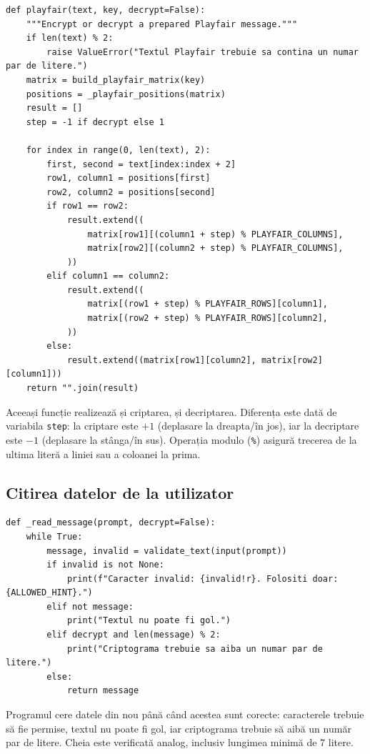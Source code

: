 \documentclass[12pt,a4paper]{article}
\begin{document}
\begin{lstlisting}[caption={Aplicarea celor trei reguli Playfair}]
def playfair(text, key, decrypt=False):
    """Encrypt or decrypt a prepared Playfair message."""
    if len(text) % 2:
        raise ValueError("Textul Playfair trebuie sa contina un numar par de litere.")
    matrix = build_playfair_matrix(key)
    positions = _playfair_positions(matrix)
    result = []
    step = -1 if decrypt else 1

    for index in range(0, len(text), 2):
        first, second = text[index:index + 2]
        row1, column1 = positions[first]
        row2, column2 = positions[second]
        if row1 == row2:
            result.extend((
                matrix[row1][(column1 + step) % PLAYFAIR_COLUMNS],
                matrix[row2][(column2 + step) % PLAYFAIR_COLUMNS],
            ))
        elif column1 == column2:
            result.extend((
                matrix[(row1 + step) % PLAYFAIR_ROWS][column1],
                matrix[(row2 + step) % PLAYFAIR_ROWS][column2],
            ))
        else:
            result.extend((matrix[row1][column2], matrix[row2][column1]))
    return "".join(result)
\end{lstlisting}

Aceeași funcție realizează și criptarea, și decriptarea. Diferența este dată de
variabila \texttt{step}: la criptare este $+1$ (deplasare la dreapta/în jos), iar la
decriptare este $-1$ (deplasare la stânga/în sus). Operația modulo (\texttt{\%})
asigură trecerea de la ultima literă a liniei sau a coloanei la prima.

\subsection{Citirea datelor de la utilizator}

\begin{lstlisting}[caption={Citirea mesajului cu verificarea erorilor}]
def _read_message(prompt, decrypt=False):
    while True:
        message, invalid = validate_text(input(prompt))
        if invalid is not None:
            print(f"Caracter invalid: {invalid!r}. Folositi doar: {ALLOWED_HINT}.")
        elif not message:
            print("Textul nu poate fi gol.")
        elif decrypt and len(message) % 2:
            print("Criptograma trebuie sa aiba un numar par de litere.")
        else:
            return message
\end{lstlisting}

Programul cere datele din nou până când acestea sunt corecte: caracterele trebuie
să fie permise, textul nu poate fi gol, iar criptograma trebuie să aibă un număr par
de litere. Cheia este verificată analog, inclusiv lungimea minimă de 7 litere.
\end{document}
